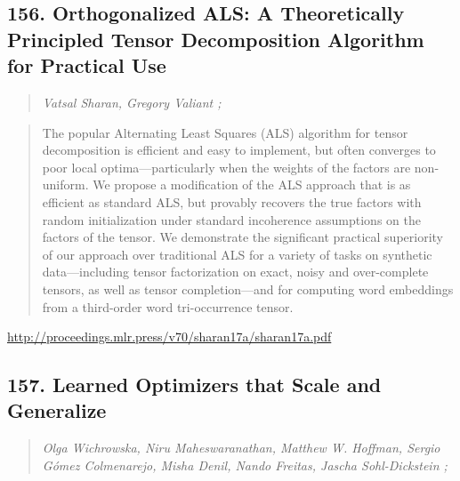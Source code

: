 \documentclass{article}
\begin{document}
\subsection{156. Orthogonalized ALS: A Theoretically Principled Tensor Decomposition Algorithm for Practical Use}

\begin{quote}
\footnotesize{\textit{Vatsal Sharan, Gregory Valiant ;}}

\end{quote}

\begin{quote}
    The popular Alternating Least Squares (ALS) algorithm for tensor decomposition is efficient and easy to implement, but often converges to poor local optima—particularly when the weights of the factors are non-uniform. We propose a modification of the ALS approach that is as efficient as standard ALS, but provably recovers the true factors with random initialization under standard incoherence assumptions on the factors of the tensor. We demonstrate the significant practical superiority of our approach over traditional ALS for a variety of tasks on synthetic data—including tensor factorization on exact, noisy and over-complete tensors, as well as tensor completion—and for computing word embeddings from a third-order word tri-occurrence tensor.  
\end{quote}

\href{http://proceedings.mlr.press/v70/sharan17a/sharan17a.pdf}{http://proceedings.mlr.press/v70/sharan17a/sharan17a.pdf}

\subsection{157. Learned Optimizers that Scale and Generalize}

\begin{quote}
\footnotesize{\textit{Olga Wichrowska, Niru Maheswaranathan, Matthew W. Hoffman, Sergio Gómez Colmenarejo, Misha Denil, Nando Freitas, Jascha Sohl-Dickstein ;}}

\end{quote}
\end{document}
